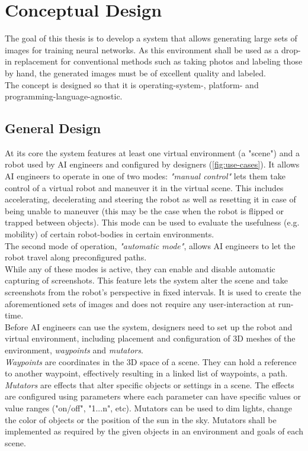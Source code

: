 \chapter{Conceptual Design}
The goal of this thesis is to develop a system that allows generating large sets of images for training neural networks. As this environment shall be used as a drop-in replacement for conventional methods such as taking photos and labeling those by hand, the generated images must be of excellent quality and labeled.\\
The concept is designed so that it is operating-system-, platform- and programming-language-agnostic.

\section{General Design}
At its core the system features at least one virtual environment (a "scene") and a robot used by AI engineers and configured by designers (\ref{fig:use-cases}). It allows AI engineers to operate in one of two modes: \textit{"manual control"} lets them take control of a virtual robot and maneuver it in the virtual scene. This includes accelerating, decelerating and steering the robot as well as resetting it in case of being unable to maneuver (this may be the case when the robot is flipped or trapped between objects). This mode can be used to evaluate the usefulness (e.g. mobility) of certain robot-bodies in certain environments.\\
The second mode of operation, \textit{"automatic mode"}, allows AI engineers to let the robot travel along preconfigured paths.\\
While any of these modes is active, they can enable and disable automatic capturing of screenshots. This feature lets the system alter the scene and take screenshots from the robot's perspective in fixed intervals. It is used to create the aforementioned sets of images and does not require any user-interaction at run-time.\\
Before AI engineers can use the system, designers need to set up the robot and virtual environment, including placement and configuration of 3D meshes of the environment, \textit{waypoints} and \textit{mutators}.\\
\textit{Waypoints} are coordinates in the 3D space of a scene. They can hold a reference to another waypoint, effectively resulting in a linked list of waypoints, a path.\\
\textit{Mutators} are effects that alter specific objects or settings in a scene. The effects are configured using parameters where each parameter can have specific values or value ranges ("on/off", "1...n", etc). Mutators can be used to dim lights, change the color of objects or the position of the sun in the sky. Mutators shall be implemented as required by the given objects in an environment and goals of each scene.

